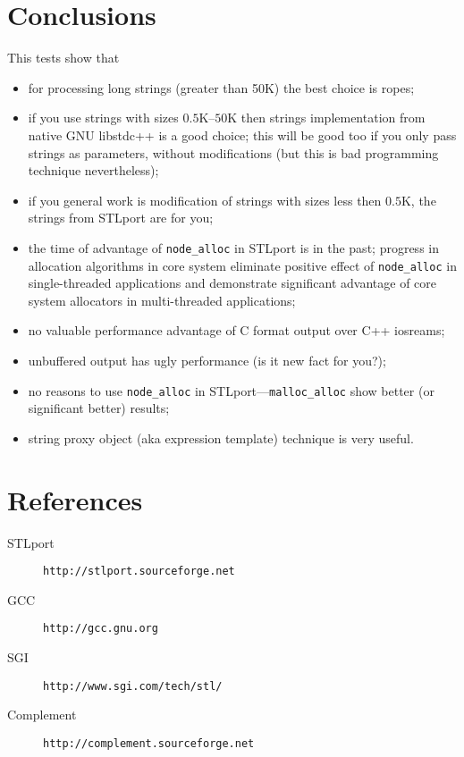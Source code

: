 \documentclass[a4paper]{article}
\providecommand{\STLport}{{\fontfamily{cmss}\selectfont STLport}}
\providecommand{\libstd}{{\fontfamily{cmtt}\selectfont GNU \mbox{libstdc++}}}
\newcommand{\CPP}{\mbox{{C}{+}{+}}}
\begin{document}
\section{Conclusions}

This tests show that
\begin{itemize}
  \item for processing long strings (greater than 50K) the best choice is
        ropes;
  \item if you use strings with sizes $0.5$K--$50$K then strings implementation
        from native \libstd{} is a good choice; this will be good too if you only pass
        strings as parameters, without modifications (but this is bad programming
        technique nevertheless);
  \item if you general work is modification of strings with sizes less then $0.5$K,
        the strings from \STLport{} are for you;
  \item the time of advantage of \texttt{node\_alloc} in \STLport{} is in the past;
        progress in allocation algorithms in core system eliminate positive
        effect of \texttt{node\_alloc} in single-threaded applications and demonstrate
        significant advantage of core system allocators in multi-threaded
        applications;
  \item no valuable performance advantage of C format output over \CPP{} iosreams;
  \item unbuffered output has ugly performance (is it new fact for you?);
  \item no reasons to use \verb|node_alloc| in \STLport{}---\verb|malloc_alloc|
        show better (or significant better) results;
  \item string proxy object (aka expression template) technique is very useful.
\end{itemize}


\section{References}

\noindent
\begin{description}
  \item[STLport] \texttt{http://stlport.sourceforge.net}
  \item[GCC]     \texttt{http://gcc.gnu.org}
  \item[SGI]     \texttt{http://www.sgi.com/tech/stl/}
  \item[Complement] \texttt{http://complement.sourceforge.net}
\end{description}
\end{document}
